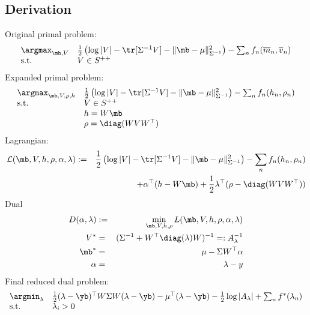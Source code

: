 \documentclass[10pt,english]{article}
\begin{document}
\subsection{Derivation}
Original primal problem:
\begin{eqnarray*}
 \begin{array}{ll} 	\argmax_{\mb,V}	&	\frac{1}{2}\left(\log\vert V\vert-\tr[\Sigma^{-1}V]-\Vert\mb-\mu\Vert^2_{\Sigma^{-1}}    \right)-\sum_{n} f_n(\overline m_n,\overline v_n)\\
			\mbox{s.t.}				&	V\in S^{++}
 \end{array}
\end{eqnarray*}
Expanded primal problem:
\begin{eqnarray*}
 \begin{array}{ll} 	\argmax_{\mb,V,\rho,h}	&	\frac{1}{2}\left(\log\vert V\vert-\tr[\Sigma^{-1}V]-\Vert\mb-\mu\Vert^2_{\Sigma^{-1}}    \right)-\sum_{n} f_n(h_n,\rho_n)\\
			\mbox{s.t.}		&	V\in S^{++}\\
						&	h=W\mb\\
						&	\rho=\diag(WVW^\top)
 \end{array}
\end{eqnarray*}
Lagrangian:
\begin{eqnarray*}
  \mathcal L(\mb,V,h,\rho,\alpha,\lambda)	&:=&	\frac{1}{2}\left(\log\vert V\vert-\tr[\Sigma^{-1}V]-\Vert\mb-\mu\Vert^2_{\Sigma^{-1}}    \right)-\sum_{n} f_n(h_n,\rho_n)\\
						&&	+\alpha^\top(h-W\mb)+\frac{1}{2}\lambda^\top(\rho-\diag(WVW^\top))
\end{eqnarray*}
Dual
\begin{eqnarray*}
 D(\alpha,\lambda)				&:=&	\min_{\mb,V,h,\rho}L(\mb,V,h,\rho,\alpha,\lambda)\\
 V^\ast						&=&	(\Sigma^{-1}+W^\top \diag(\lambda)W)^{-1}=:A_\lambda^{-1}\\
\mb^\ast					&=&	\mu-\Sigma W^\top\alpha\\
\alpha						&=&	\lambda-y
\end{eqnarray*}
Final reduced dual problem:
\begin{eqnarray*}
 \begin{array}{ll} 	\argmin_{\lambda}	&	\frac{1}{2} (\lambda-\yb)^\top W\Sigma W(\lambda-\yb)-\mu^\top(\lambda-\yb)-\frac{1}{2}\log\vert A_\lambda\vert+\sum_nf^\ast(\lambda_n)\\
			\mbox{s.t.}		&	\lambda_i>0
 \end{array}
\end{eqnarray*}
\end{document}
